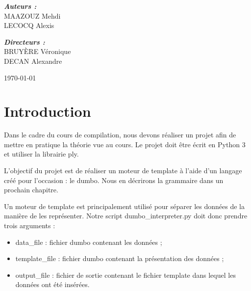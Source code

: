\documentclass[10pt,a4paper]{article}
\begin{document}
\begin{titlepage}
\begin{sffamily}
\begin{center}
				\begin{minipage}{0.4\textwidth}
					\begin{flushleft} \large
						\emph{\textbf{Auteurs :}}\\
						MAAZOUZ Mehdi\\
						LECOCQ Alexis
					\end{flushleft}
				\end{minipage}
				\begin{minipage}{0.4\textwidth}
					\begin{flushright} \large
						\emph{\textbf{Directeurs :}}\\
						BRUYÈRE Véronique\\
						DECAN Alexandre\\
					\end{flushright}
				\end{minipage}
				
				\vfill
				
				{\large \today}
				
			\end{center}
		\end{sffamily}
	\end{titlepage}
	
	\newpage
	\tableofcontents
	\newpage
	\section{Introduction}
	Dans le cadre du cours de compilation, nous devons réaliser un projet afin de mettre en pratique la théorie vue au cours.
	Le projet doit être écrit en Python 3 et utiliser la librairie ply.
	
	L'objectif du projet est de réaliser un moteur de template à l'aide d'un langage créé pour l'occasion : le dumbo. Nous en décrirons la grammaire dans un prochain chapitre.
	
	Un moteur de template est principalement utilisé pour séparer les données de la manière de les représenter. Notre script dumbo\_interpreter.py doit donc prendre trois arguments :
	\begin{itemize}
		\item data\_file : fichier dumbo contenant les données ;
		\item template\_file : fichier dumbo contenant la présentation des données ;
		\item output\_file : fichier de sortie contenant le fichier template dans lequel les données ont été insérées.
	\end{itemize}
	\newpage
\end{document}
